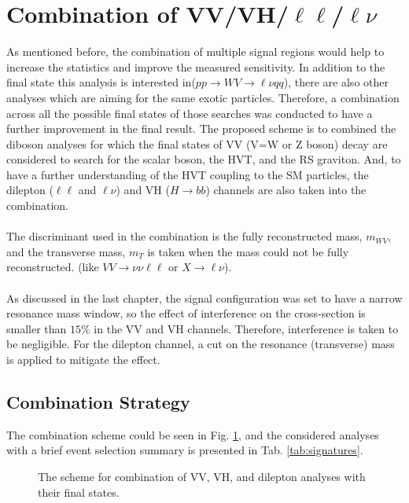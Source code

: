 \section{Combination of VV/VH/$\ell\ell$/$\ell\nu$}
As mentioned before, the combination of multiple signal regions would help to increase the statistics and improve the measured sensitivity.  In addition to the final state this analysis is interested in($pp\to WV \to \ell\nu qq$), there are also other analyses which are aiming for the same exotic particles. Therefore, a combination across all the possible final states of those searches was conducted to have a further improvement in the final result. The proposed scheme is to combined the diboson analyses for which the final states of VV (V=W or Z boson) decay are considered to search for the scalar boson, the HVT, and the RS graviton. And, to have a further understanding of the HVT coupling to the SM particles, the dilepton ($\ell\ell$ and $\ell\nu$) and VH ($H\to bb$) channels are also taken into the combination.
\\
\\The discriminant used in the combination is the fully reconstructed mass, $m_{WV}$, and the transverse mass, $m_{T}$ is taken when the mass could not be fully reconstructed. (like $VV\to\nu\nu\ell\ell$ or $X\to\ell\nu$).
\\
\\As discussed in the last chapter, the signal configuration was set to have a narrow resonance mass window, so the effect of interference on the cross-section is smaller than $15\%$ in the VV and VH channels. Therefore, interference is taken to be negligible. For the dilepton channel, a cut on the resonance (transverse) mass is applied to mitigate the effect. 
\subsection{Combination Strategy}
The combination scheme could be seen in Fig. \ref{Fig:Comb_scheme}, and the considered analyses with a brief event selection summary is presented in Tab. \ref{tab:signatures}.
\begin{figure}[ht]
	\centering
	\caption{The scheme for combination of VV, VH, and dilepton analyses with their final states.}
	\label{Fig:Comb_scheme}
\end{figure}


